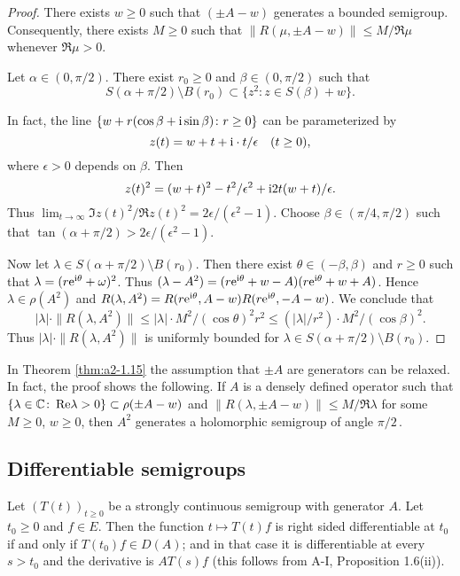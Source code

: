 \begin{proof}
There exists $w \geq 0$ such that $(\pm A - w)$ generates a bounded semigroup.
Consequently, there exists $M \geq 0$ such that $\|R(\mu,\pm A - w)\| \leq M/\Re\mu$ whenever $\Re\mu > 0$.

Let $\alpha \in (0,\pi/2)$.
There exist $r_0 \geq 0$ and $\beta \in (0,\pi/2)$ such that
\[
    S(\alpha+\pi/2)\setminus B(r_{0}) \subset \{ z^2 \colon z \in S(\beta) + w \}.
\]

In fact, the line 
$ \{w + r(\cos\beta + \mathrm{i} \sin\beta) \colon r \geq 0\} $ 
can be parameterized by 
%
\[
	 z(t) = w + t + \mathrm{i}\cdot t/\epsilon \quad (t \geq 0) ,
\]
%
where $\epsilon > 0$ depends on $\beta$.
Then 
%
\[
	z(t)^2 = (w + t)^2 - t^2/\epsilon^2 + \mathrm{i} 2t(w+t)/\epsilon .
\]
%
Thus $\lim_{t \to \infty} \Im z(t)^2/\Re z(t)^2 = 2\epsilon/(\epsilon^2-1)$.
Choose $\beta \in (\pi/4,\pi/2)$ such that $\tan(\alpha + \pi/2) > 2\epsilon/(\epsilon^2-1)$. 

Now let $\lambda \in S(\alpha+\pi/2)\setminus B(r_{0})$.
Then there exist $\theta \in (-\beta,\beta)$ 
and $r \geq 0$
such that $\lambda = (r\mathrm{e}^{\mathrm{i}\theta}+\omega)^2$.
Thus $(\lambda-A^2) = (r\mathrm{e}^{\mathrm{i}\theta}+w - A)(r\mathrm{e}^{\mathrm{i}\theta}+w + A)$.
Hence $\lambda \in \rho(A^2)$ and $R(\lambda,A^2) = R(r\mathrm{e}^{\mathrm{i}\theta},A-w)R(r\mathrm{e}^{\mathrm{i}\theta},-A-w)$.
We conclude that 
\[
|\lambda| \cdot \|R(\lambda,A^2)\| \leq |\lambda| \cdot M^2/(\cos\theta)^2r^2 \leq (|\lambda|/r^2)\cdot M^2/(\cos\beta)^2.
\]
Thus $|\lambda| \cdot \|R(\lambda,A^2)\|$ is uniformly bounded for $\lambda \in S(\alpha+\pi/2) \setminus B(r_0)$.
\end{proof}
\begin{remark*}\label{rem:a2-1.7-kgk}
In Theorem  \ref{thm:a2-1.15}  
the assumption that $\pm A$ are generators can be relaxed.
In fact, the proof shows the following.
If $A$ is a densely defined operator such that 
$\{\lambda \in \mathbb{C} \colon \mathop{}\!\mathrm{Re}\lambda > 0\} \subset \rho(\pm A - w)$ and 
$\|R(\lambda,\pm A - w)\| \leq M/\Re\lambda$ for some $M \geq 0$, $w \geq 0$, then $A^2$ generates a holomorphic semigroup of angle $\pi/2$\,.
\end{remark*}

\subsection{Differentiable semigroups} \label{subsec:a2-1.se5}%
Let $(T(t))_{t\geq 0}$ be a strongly continuous semigroup with generator $A$.
Let $t_0 \geq 0$ and $f \in E$.
Then the function $t \mapsto T(t)f$ is right sided differentiable at $t_0$ if and only if $T(t_0)f \in D(A)$; and in that case it is differentiable at every $s > t_0$ and the derivative is $AT(s)f$ (this follows from A-I, Proposition 1.6(ii)).

